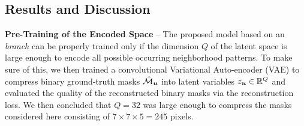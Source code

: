 
\subsection{Results and Discussion}

\textbf{Pre-Training of the Encoded Space} -- The proposed model based on an \emph{\encBr branch} can be properly trained only if the dimension $Q$ of the latent space is large enough to encode all possible occurring neighborhood patterns. 
To make sure of this, we then trained a convolutional Variational Auto-encoder (VAE) \cite{kingma2013auto,rezende2014stochastic} to compress binary ground-truth \maskname masks $\hat{\mathcal{M}}_{\bm{u}}$ into latent variables $z_{\bm{u}}\in \mathbb{R}^Q$ and evaluated the quality of the reconstructed binary masks via the reconstruction loss. We then concluded that $Q=32$ was large enough to compress the masks considered here consisting of $7\times 7 \times 5=245$ pixels. 

